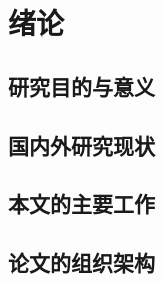 \section{绪论}


\subsection{研究目的与意义}




\subsection{国内外研究现状}



\subsection{本文的主要工作}


\subsection{论文的组织架构}

\newpage

